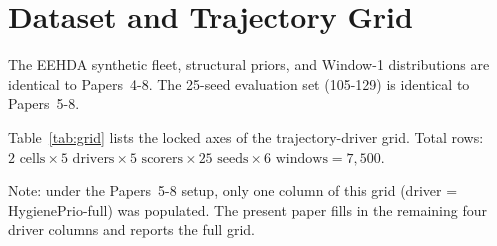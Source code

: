 \section{Dataset and Trajectory Grid}

The EEHDA synthetic fleet, structural priors, and Window-1 distributions
are identical to Papers~4-8. The 25-seed evaluation set (105-129) is
identical to Papers~5-8.



Table~\ref{tab:grid} lists the locked axes of the trajectory-driver
grid. Total rows: $2 \text{ cells} \times 5 \text{ drivers} \times 5
\text{ scorers} \times 25 \text{ seeds} \times 6 \text{ windows} =
7{,}500$.

Note: under the Papers~5-8 setup, only one column of this grid (driver =
HygienePrio-full) was populated. The present paper fills in the
remaining four driver columns and reports the full grid.
